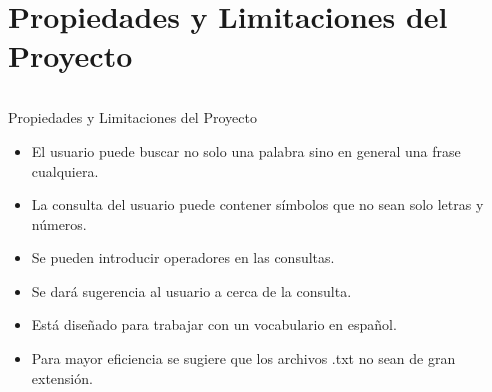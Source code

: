 \section{Propiedades y Limitaciones del Proyecto}

\begin{frame}
    \begin{columns}[t]
        \begin{column}{.5\textwidth}
          \tableofcontents[sections={1-2},currentsection]
        \end{column}
        \begin{column}{.5\textwidth}
          \tableofcontents[sections={3-4},currentsection]
        \end{column}
    \end{columns}
\end{frame}
\begin {frame}
Propiedades y Limitaciones del Proyecto
\begin{itemize}
    \item El usuario puede buscar no solo una palabra sino en general una frase 
    cualquiera. 
    \item La consulta del usuario puede contener símbolos que no sean solo letras y 
    números. 
    \item Se pueden introducir operadores en las consultas. 
    \item Se dará sugerencia al usuario a cerca de la consulta. 
    \item Está diseñado para trabajar con un vocabulario en español. 
    \item Para mayor eficiencia se sugiere que los archivos .txt no sean de gran 
    extensión.
\end{itemize}
\end {frame}
